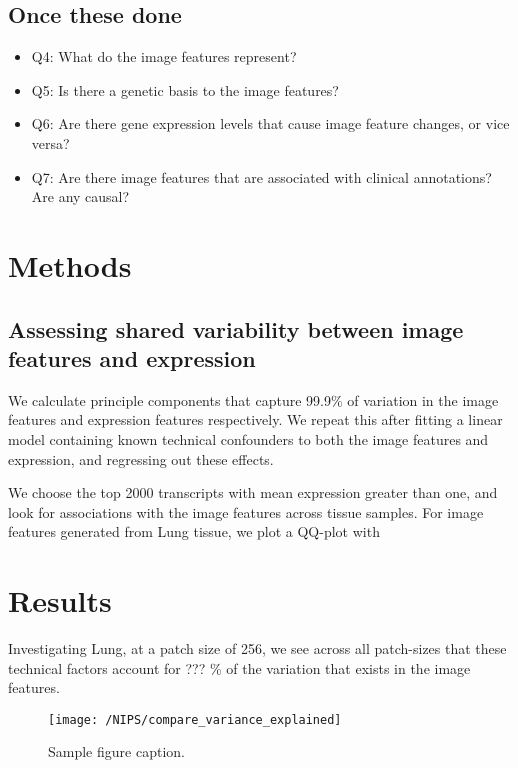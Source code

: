 \documentclass{article}
\begin{document}
\subsection*{Once these done}
\begin{itemize}
\item Q4: What do the image features represent?
\item Q5: Is there a genetic basis to the image features?
\item Q6: Are there gene expression levels that cause image feature changes, or vice versa?
\item Q7: Are there image features that are associated with clinical annotations? Are any causal?

\end{itemize}

\section*{Methods}

\subsection*{Assessing shared variability between image features and expression}
We calculate principle components that capture 99.9\% of variation in the image features and expression features respectively. We repeat this after fitting a linear model containing known technical confounders to both the image features and expression, and regressing out these effects.

We choose the top 2000 transcripts with mean expression greater than one, and look for associations with the image features across tissue samples. For image features generated from Lung tissue, we plot a QQ-plot with 

\section*{Results}

Investigating Lung, at a patch size of 256, we see across all patch-sizes that these technical factors account for ??? \% of the variation that exists in the image features.

\begin{figure}[H]
  \centering


    \texttt{[image: /NIPS/compare\_variance\_explained]} 
  \caption{Sample figure caption.}
\end{figure}




%
%
\end{document}
